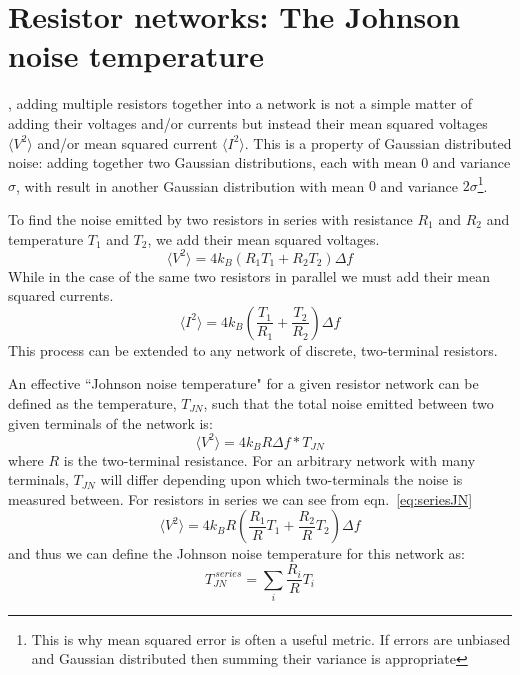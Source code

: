 \section{Resistor networks: The Johnson noise temperature}
\label{section:TJN}
, adding multiple resistors together into a network is not a simple matter of adding their voltages and/or currents but instead their mean squared voltages $\langle V^2\rangle$ and/or mean squared current $\langle I^2\rangle$. This is a property of Gaussian distributed noise: adding together two Gaussian distributions, each with mean $0$ and variance $\sigma$, with result in another Gaussian distribution with mean $0$ and variance $2\sigma$\footnote{This is why mean squared error is often a useful metric. If errors are unbiased and Gaussian distributed then summing their variance is appropriate}.

To find the noise emitted by two resistors in series with resistance $R_1$ and $R_2$ and temperature $T_1$ and $T_2$, we add their mean squared voltages.
\begin{equation} \label{eq:seriesJN}
\langle V^2\rangle = 4k_B (R_1T_1+R_2T_2)\Delta f
\end{equation}
While in the case of the same two resistors in parallel we must add their mean squared currents.
\begin{equation} \label{eq:parallelJN}
\langle I^2\rangle = 4k_B \left(\frac{T_1}{R_1}+\frac{T_2}{R_2}\right)\Delta f
\end{equation}
This process can be extended to any network of discrete, two-terminal resistors.

An effective ``Johnson noise temperature" for a given resistor network can be defined as the temperature, $T_{JN}$, such that the total noise emitted between two given terminals of the network is:
\begin{equation}
\langle V^2\rangle = 4k_BR\Delta f * T_{JN}
\end{equation}
where $R$ is the two-terminal resistance. For an arbitrary network with many terminals, $T_{JN}$ will differ depending upon which two-terminals the noise is measured between. For resistors in series we can see from eqn.~\ref{eq:seriesJN}
\begin{equation}
\langle V^2\rangle = 4k_BR \left(\frac{R_1}{R}T_1+\frac{R_2}{R}T_2\right)\Delta f
\end{equation}
and thus we can define the Johnson noise temperature for this network as:
\begin{equation}
T_{JN}^{\ series} = \sum_i \frac{R_i}{R}T_i
\end{equation}

